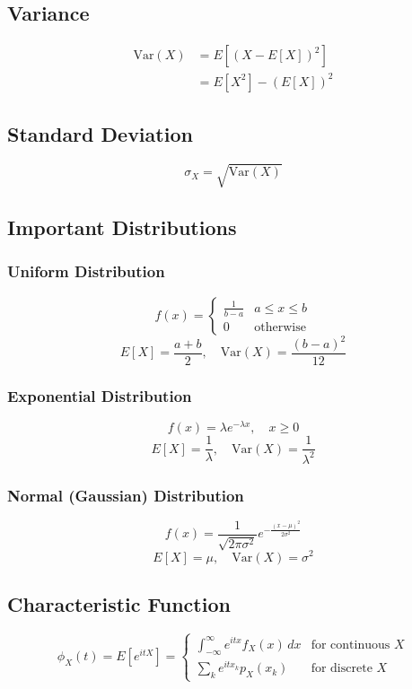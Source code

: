 \documentclass[10pt, twocolumn]{article}
\begin{document}
\subsection{Variance}
\begin{align}
    \text{Var}(X) & = E[(X - E[X])^2]   \\
                  & = E[X^2] - (E[X])^2
\end{align}

\subsection{Standard Deviation}
\[ \sigma_X = \sqrt{\text{Var}(X)} \]

\subsection{Important Distributions}

\subsubsection{Uniform Distribution}
\[ f(x) = \begin{cases}
        \frac{1}{b-a} & a \leq x \leq b  \\
        0             & \text{otherwise}
    \end{cases} \]
\[ E[X] = \frac{a+b}{2}, \quad \text{Var}(X) = \frac{(b-a)^2}{12} \]

\subsubsection{Exponential Distribution}
\[ f(x) = \lambda e^{-\lambda x}, \quad x \geq 0 \]
\[ E[X] = \frac{1}{\lambda}, \quad \text{Var}(X) = \frac{1}{\lambda^2} \]

\subsubsection{Normal (Gaussian) Distribution}
\[ f(x) = \frac{1}{\sqrt{2\pi\sigma^2}} e^{-\frac{(x-\mu)^2}{2\sigma^2}} \]
\[ E[X] = \mu, \quad \text{Var}(X) = \sigma^2 \]

\subsection{Characteristic Function}

\[\phi_X(t) = E[e^{itX}] = \begin{cases} \int_{-\infty}^{\infty} e^{itx} f_X(x) \,dx & \text{for continuous } X \\ \sum_{k} e^{itx_k} p_X(x_k) & \text{for discrete } X \end{cases} \]
\end{document}
